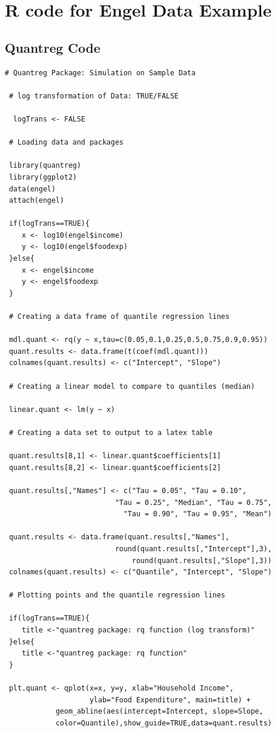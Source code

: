 \documentclass[12pt,a4paper]{report}
\begin{document}
\newpage
{}



\newpage
\appendix
{}

\chapter{R code for Engel Data Example}

\section{Quantreg Code}\label{App:Engel-Code-Quantreg}
\begin{lstlisting}
# Quantreg Package: Simulation on Sample Data

 # log transformation of Data: TRUE/FALSE

  logTrans <- FALSE

 # Loading data and packages

 library(quantreg)
 library(ggplot2)
 data(engel)
 attach(engel)

 if(logTrans==TRUE){
    x <- log10(engel$income)
    y <- log10(engel$foodexp)
 }else{
    x <- engel$income
    y <- engel$foodexp
 }

 # Creating a data frame of quantile regression lines

 mdl.quant <- rq(y ~ x,tau=c(0.05,0.1,0.25,0.5,0.75,0.9,0.95))
 quant.results <- data.frame(t(coef(mdl.quant)))
 colnames(quant.results) <- c("Intercept", "Slope")

 # Creating a linear model to compare to quantiles (median)

 linear.quant <- lm(y ~ x)

 # Creating a data set to output to a latex table

 quant.results[8,1] <- linear.quant$coefficients[1]
 quant.results[8,2] <- linear.quant$coefficients[2]

 quant.results[,"Names"] <- c("Tau = 0.05", "Tau = 0.10",
                          "Tau = 0.25", "Median", "Tau = 0.75",
                            "Tau = 0.90", "Tau = 0.95", "Mean")

 quant.results <- data.frame(quant.results[,"Names"],
                          round(quant.results[,"Intercept"],3),
                              round(quant.results[,"Slope"],3))
 colnames(quant.results) <- c("Quantile", "Intercept", "Slope")

 # Plotting points and the quantile regression lines

 if(logTrans==TRUE){
    title <-"quantreg package: rq function (log transform)"
 }else{
    title <-"quantreg package: rq function"
 }

 plt.quant <- qplot(x=x, y=y, xlab="Household Income",
                    ylab="Food Expenditure", main=title) +
            geom_abline(aes(intercept=Intercept, slope=Slope,
            color=Quantile),show_guide=TRUE,data=quant.results)
\end{lstlisting}
\end{document}
